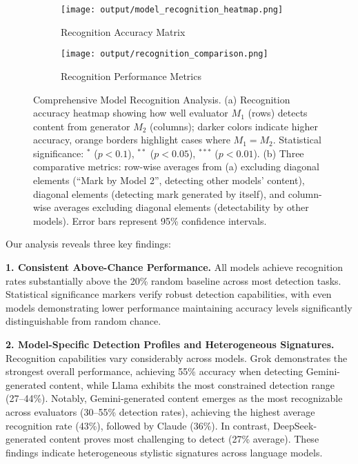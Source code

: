 \documentclass{article}
\begin{document}
\begin{figure}[ht]
    \centering
    \begin{subfigure}[b]{0.55\textwidth}
        \centering
        \texttt{[image: output/model\_recognition\_heatmap.png]}
        \caption{Recognition Accuracy Matrix}
        \label{fig:recognition_heatmap}
    \end{subfigure}
    \hfill
    \begin{subfigure}[b]{0.8\textwidth}
        \centering
        \texttt{[image: output/recognition\_comparison.png]}
        \caption{Recognition Performance Metrics}
        \label{fig:recognition_comparison}
    \end{subfigure}
\caption{Comprehensive Model Recognition Analysis. (a) Recognition accuracy heatmap showing how well evaluator $M_1$ (rows) detects content from generator $M_2$ (columns); darker colors indicate higher accuracy, orange borders highlight cases where $M_1 = M_2$. Statistical significance: $^*$ ($p < 0.1$), $^{**}$ ($p < 0.05$), $^{***}$ ($p < 0.01$). (b) Three comparative metrics: row-wise averages from (a) excluding diagonal elements (``Mark by Model 2'', detecting other models' content), diagonal elements (detecting mark generated by itself), and column-wise averages excluding diagonal elements (detectability by other models). Error bars represent 95\% confidence intervals. }
    \label{fig:model_recognition_analysis}
\end{figure}

Our analysis reveals three key findings:

\textbf{1. Consistent Above-Chance Performance.} All models achieve recognition rates substantially above the 20\% random baseline across most detection tasks. Statistical significance markers verify robust detection capabilities, with even models demonstrating lower performance maintaining accuracy levels significantly distinguishable from random chance.

\textbf{2. Model-Specific Detection Profiles and Heterogeneous Signatures.} Recognition capabilities vary considerably across models. Grok demonstrates the strongest overall performance, achieving 55\% accuracy when detecting Gemini-generated content, while Llama exhibits the most constrained detection range (27--44\%). Notably, Gemini-generated content emerges as the most recognizable across evaluators (30--55\% detection rates), achieving the highest average recognition rate (43\%), followed by Claude (36\%). In contrast, DeepSeek-generated content proves most challenging to detect (27\% average). These findings indicate heterogeneous stylistic signatures across language models.
\end{document}
